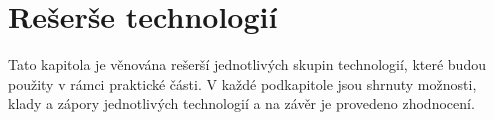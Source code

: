 \chapter{Rešerše technologií}

Tato kapitola je věnována rešerší jednotlivých skupin technologií,
které budou použity v rámci praktické části.
V každé podkapitole jsou shrnuty možnosti, klady a zápory
jednotlivých technologií a na závěr je provedeno zhodnocení.







